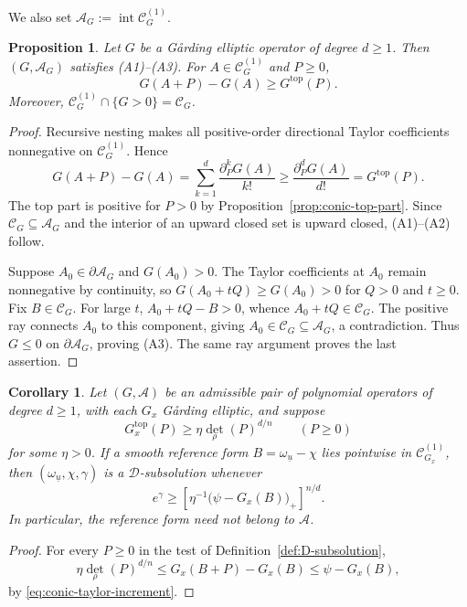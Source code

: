 \documentclass[oneside,english,letterpaper]{amsart}
\numberwithin{equation}{section}
\theoremstyle{plain}
\newtheorem{prop}[thm]{Proposition}
\newtheorem{cor}[thm]{Corollary}
\theoremstyle{definition}
\theoremstyle{remark}
\begin{document}
We also set $\mathcal A_G:=\operatorname{int}\mathcal C_G^{(1)}$.




\begin{prop}
\label{prop:positive-branch-admissible}
Let $G$ be a G{\aa}rding elliptic operator of degree $d\geq1$.
Then $(G,\mathcal A_G)$ satisfies \textnormal{(A1)--(A3)}. For
$A\in\mathcal C_G^{(1)}$ and $P\geq0$,
\begin{equation}\label{eq:conic-taylor-increment}
G(A+P)-G(A)\geq G^{\mathrm{top}}(P).
\end{equation}
Moreover, $\mathcal C_G^{(1)}\cap\{G>0\}=\mathcal C_G$.
\end{prop}
\begin{proof}
Recursive nesting makes all positive-order directional Taylor
coefficients nonnegative on $\mathcal C_G^{(1)}$. Hence
\[
G(A+P)-G(A)=\sum_{k=1}^d\frac{\partial_P^kG(A)}{k!}
\geq\frac{\partial_P^dG(A)}{d!}=G^{\mathrm{top}}(P).
\]
The top part is positive for $P>0$ by
Proposition~\ref{prop:conic-top-part}. Since
$\mathcal C_G\subseteq\mathcal A_G$ and the interior of an upward
closed set is upward closed, \textnormal{(A1)--(A2)} follow.

Suppose $A_0\in\partial\mathcal A_G$ and $G(A_0)>0$.
The Taylor coefficients at $A_0$ remain nonnegative by continuity,
so $G(A_0+tQ)\geq G(A_0)>0$ for $Q>0$ and $t\geq0$.
Fix $B\in\mathcal C_G$. For large $t$, $A_0+tQ-B>0$, whence
$A_0+tQ\in\mathcal C_G$. The positive ray connects $A_0$ to this
component, giving $A_0\in\mathcal C_G\subseteq\mathcal A_G$, a
contradiction. Thus $G\leq0$ on $\partial\mathcal A_G$, proving
\textnormal{(A3)}. The same ray argument proves the last assertion.
\end{proof}

\begin{cor}
\label{cor:polynomial-D-subsolution}
Let $(G,\mathcal A)$ be an admissible pair of polynomial operators
of degree $d\geq1$, with each $G_x$ G{\aa}rding elliptic, and suppose
\[
G_x^{\mathrm{top}}(P)\geq\eta\det_\rho(P)^{d/n}
\qquad(P\geq0)
\]
for some $\eta>0$. If a smooth reference form
$B=\omega_{\underline u}-\chi$ lies pointwise in
$\mathcal C_{G_x}^{(1)}$, then $(\omega_{\underline u},\chi,\gamma)$
is a $\mathcal D$-subsolution whenever
\[
e^\gamma\geq
\left[\eta^{-1}\bigl(\psi-G_x(B)\bigr)_+\right]^{n/d}.
\]
In particular, the reference form need not belong to $\mathcal A$.
\end{cor}
\begin{proof}
For every $P\geq0$ in the test of Definition~\ref{def:D-subsolution},
\[
\eta\det_\rho(P)^{d/n}
\leq G_x(B+P)-G_x(B)\leq\psi-G_x(B),
\]
by \eqref{eq:conic-taylor-increment}.
\end{proof}
\end{document}
